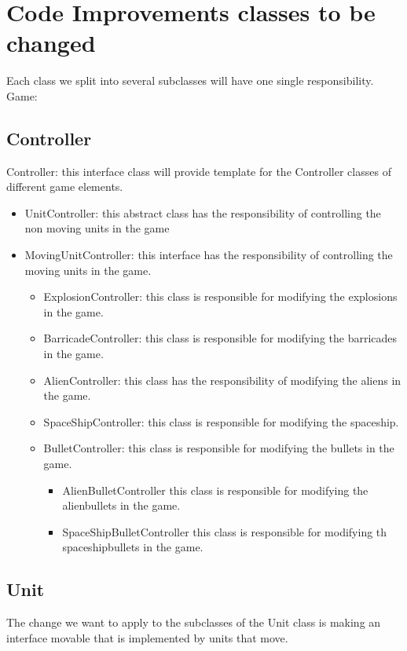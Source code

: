 \section*{Code Improvements classes to be changed}
Each class we split into several subclasses will have one single responsibility. \\
Game:
\subsection*{Controller}
Controller: this interface class will provide template for the Controller classes of different game elements. 
	\begin{itemize}
	\item UnitController: this abstract class has the responsibility of controlling the non moving units in the game
	\item MovingUnitController: this interface has the responsibility of controlling the moving units in the game. 
		\begin{itemize}
			\item ExplosionController: this class is responsible for modifying the explosions in the game.
			\item BarricadeController: this class is responsible for modifying the 	barricades in the game.
			\item AlienController: this class has the responsibility of modifying the aliens in the game.
			\item SpaceShipController: this class is responsible for modifying the spaceship.
			\item BulletController: this class is responsible for modifying the bullets in the game.
			\begin{itemize}
				\item AlienBulletController this class is responsible for modifying the alienbullets in the game.
				\item SpaceShipBulletController this class is responsible for modifying th spaceshipbullets in the game.
			\end{itemize}
		\end{itemize}
	\end{itemize}
\subsection*{Unit}
The change we want to apply to the subclasses of the Unit class is making an interface movable that is implemented by units that move.
